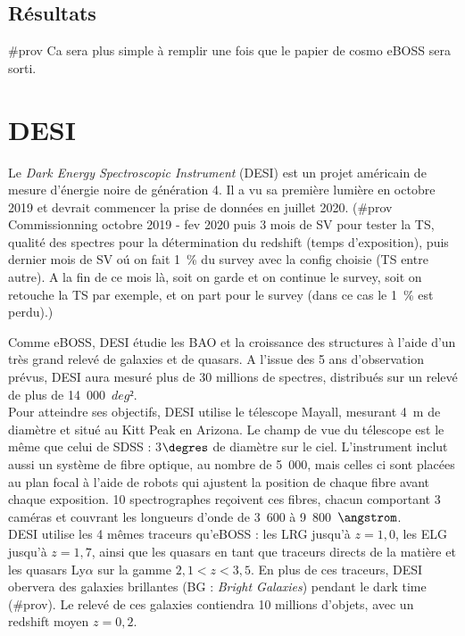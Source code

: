 \message{ !name(doc.tex)}\documentclass[11pt, twoside, a4paper, openright]{report}
\begin{document}



\subsection{Résultats}

\#prov Ca sera plus simple à remplir une fois que le papier de cosmo eBOSS sera sorti.

\section{DESI}

Le \emph{Dark Energy Spectroscopic Instrument} (DESI) est un projet américain de mesure d'énergie noire de génération 4. Il a vu sa première lumière en octobre 2019 et devrait commencer la prise de données en juillet 2020. (\#prov Commissionning octobre 2019 - fev 2020 puis 3 mois de SV pour tester la TS, qualité des spectres pour la détermination du redshift (temps d'exposition), puis dernier mois de SV oú on fait 1~\% du survey avec la config choisie (TS entre autre). A la fin de ce mois là, soit on garde et on continue le survey, soit on retouche la TS par exemple, et on part pour le survey (dans ce cas le 1~\% est perdu).)

Comme eBOSS, DESI étudie les BAO et la croissance des structures à l'aide d'un très grand relevé de galaxies et de quasars. A l'issue des 5 ans d'observation prévus, DESI aura mesuré plus de 30 millions de spectres, distribués sur un relevé de plus de 14~000~$deg²$. \\
Pour atteindre ses objectifs, DESI utilise le télescope Mayall, mesurant 4~m de diamètre et situé au Kitt Peak en Arizona. Le champ de vue du télescope est le même que celui de SDSS : 3$\degres$ de diamètre sur le ciel. L'instrument inclut aussi un système de fibre optique, au nombre de 5~000, mais celles ci sont placées au plan focal à l'aide de robots qui ajustent la position de chaque fibre avant chaque exposition. 10 spectrographes reçoivent ces fibres, chacun comportant 3 caméras et couvrant les longueurs d'onde de 3~600 à 9~800~$\angstrom$. \\
‌‌DESI utilise les 4 mêmes traceurs qu'eBOSS : les LRG jusqu'à $z=1,0$, les ELG jusqu'à $z=1,7$, ainsi que les quasars en tant que traceurs directs de la matière et les quasars Ly$\alpha$ sur la gamme $2,1 < z < 3,5$. En plus de ces traceurs, DESI obervera des galaxies brillantes (BG : \emph{Bright Galaxies}) pendant le dark time (\#prov). Le relevé de ces galaxies contiendra 10 millions d'objets, avec un redshift moyen $z=0,2$.
\end{document}
